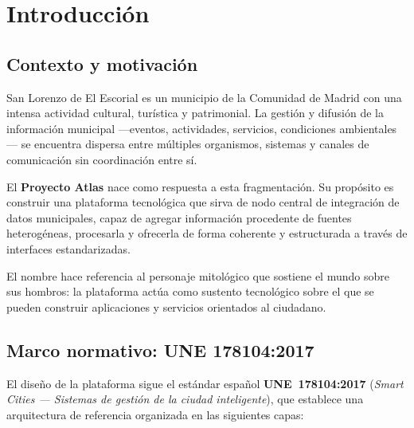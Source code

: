\chapter{Introducción}
\label{cap:introduccion}

\section{Contexto y motivación}

San Lorenzo de El Escorial es un municipio de la Comunidad de Madrid con una intensa actividad cultural, turística y patrimonial. La gestión y difusión de la información municipal —eventos, actividades, servicios, condiciones ambientales— se encuentra dispersa entre múltiples organismos, sistemas y canales de comunicación sin coordinación entre sí.

El \textbf{Proyecto Atlas} nace como respuesta a esta fragmentación. Su propósito es construir una plataforma tecnológica que sirva de nodo central de integración de datos municipales, capaz de agregar información procedente de fuentes heterogéneas, procesarla y ofrecerla de forma coherente y estructurada a través de interfaces estandarizadas.

El nombre hace referencia al personaje mitológico que sostiene el mundo sobre sus hombros: la plataforma actúa como sustento tecnológico sobre el que se pueden construir aplicaciones y servicios orientados al ciudadano.

\section{Marco normativo: UNE 178104:2017}

El diseño de la plataforma sigue el estándar español \textbf{UNE~178104:2017} (\textit{Smart Cities — Sistemas de gestión de la ciudad inteligente}), que establece una arquitectura de referencia organizada en las siguientes capas:

